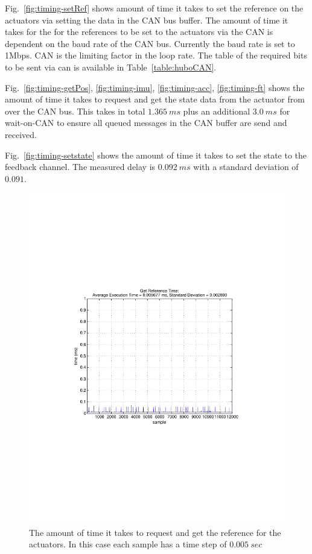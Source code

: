 Fig.~\ref{fig:timing-setRef} shows amount of time it takes to set the reference on the actuators via setting the data in the CAN bus buffer.
The amount of time it takes for the for the references to be set to the actuators via the CAN is dependent on the baud rate of the CAN bus.
Currently the baud rate is set to 1Mbps.
CAN is the limiting factor in the loop rate.
The table of the required bits to be sent via can is available in Table~\ref{table:huboCAN}.





Fig.~\ref{fig:timing-getPos}, \ref{fig:timing-imu}, \ref{fig:timing-acc}, \ref{fig:timing-ft} shows the amount of time it takes to request and get the state data from the actuator from over the CAN bus.
This takes in total $1.365~ms$ plus an additional $3.0~ms$ for wait-on-CAN to ensure all queued messages in the CAN buffer are send and received. 


Fig.~\ref{fig:timing-setstate} shows the amount of time it takes to set the state to the feedback channel.
The measured delay is $0.092~ms$ with a standard deviation of $0.091$.





\begin{figure}[thpb]
  \centering
\includegraphics[width=0.6\columnwidth]{./timingData/getRef.pdf}
  \caption{The amount of time it takes to request and get the reference for the actuators.  In this case each sample has a time step of $0.005~sec$}
  \label{fig:timing-getRef}
\end{figure}


